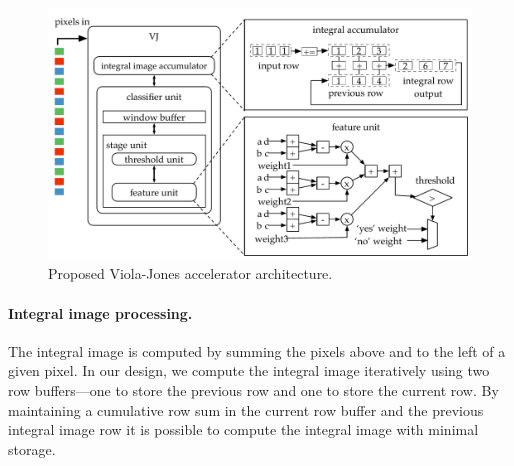 \begin{figure}
      \includegraphics[width=\textwidth]{nsp-figs/vj_arch.pdf}
    \caption{Proposed Viola-Jones accelerator architecture.}

    \label{fig:vj-block}
\end{figure}

%
\paragraph{Integral image processing.} The integral image is computed by summing the pixels above and to the left of
a given pixel. In our design, we
compute the integral image iteratively using two row buffers---one to store the
previous row and one to store the current row. By maintaining
a cumulative row sum in the current row buffer and the previous integral image row
it is possible to compute the integral image with minimal storage.




